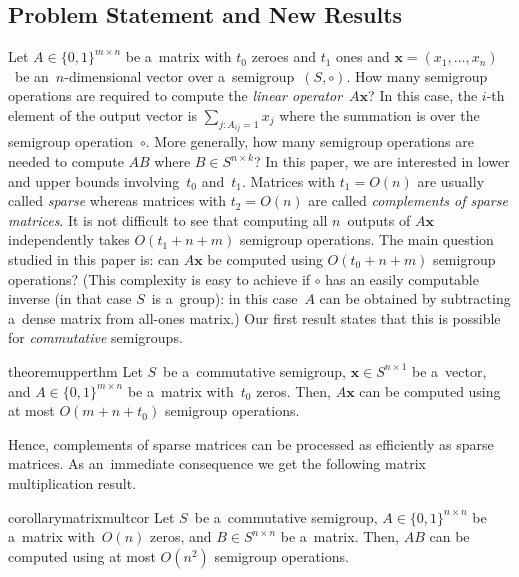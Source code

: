 \documentclass[11pt,letterpaper]{article}
\begin{document}
\subsection{Problem Statement and New Results}
Let $A \in \{0,1\}^{m \times n}$ be a~matrix with $t_0$ zeroes
and $t_1$ ones and 
$\mathbf{x}=(x_1, \dotsc, x_n)$~be an~$n$-dimensional vector 
over a~semigroup~$(S, \circ)$. 
How many semigroup operations are required to 
compute the \emph{linear operator}~$A\mathbf{x}$?
In this case, the $i$-th element of the output vector is
$\sum_{j \colon A_{ij}=1}x_j$ where the summation 
is over the semigroup operation~$\circ$.
More generally, how many semigroup operations are needed 
to compute $AB$ where $B \in S^{n \times k}$?
In this paper, 
we are interested in lower and upper bounds 
involving~$t_0$ and~$t_1$. 
Matrices with $t_1=O(n)$ are usually called \emph{sparse} 
whereas matrices with $t_2=O(n)$ 
are called \emph{complements of sparse matrices}. 
It is not difficult to see that computing all $n$~outputs
of $A\mathbf{x}$ independently takes
$O(t_1+n+m)$ semigroup operations.
The main question studied in this paper is: 
can $A\mathbf{x}$ be computed using $O(t_0+n+m)$ semigroup 
operations? (This complexity is easy to achieve if $\circ$ has an
easily computable inverse (in that case $S$~is a~group): in this case~$A$ can be obtained by subtracting a~dense matrix from all-ones matrix.) Our first result states that this is possible for 
\emph{commutative} semigroups.

\begin{restatable}{theorem}{upperthm}
\label{thm:upperbound}
Let $S$~be a~commutative semigroup, 
$\mathbf{x} \in S^{n \times 1}$ be a~vector, 
and $A \in \{0,1\}^{m \times n}$ be a~matrix with~$t_0$ zeros.
Then, $A\mathbf{x}$ can be computed using at most 
$O(m+n+t_0)$ semigroup operations.
\end{restatable}

Hence, complements of sparse matrices can be processed as
efficiently as sparse matrices.
As an~immediate consequence we get the following matrix 
multiplication result.

\begin{restatable}{corollary}{matrixmultcor}
\label{cor:matrixmultiplication}
Let $S$~be a~commutative semigroup, 
$A \in \{0,1\}^{n \times n}$ be a~matrix with~$O(n)$ zeros,
and $B \in S^{n \times n}$ be a~matrix. Then, 
$AB$ can be computed using at most 
$O(n^2)$ semigroup operations.
\end{restatable}
\end{document}

